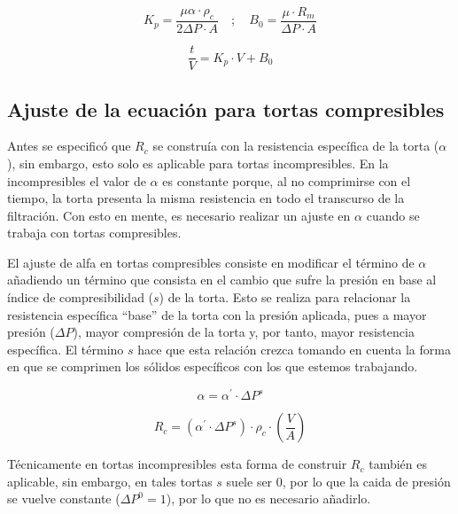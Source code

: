 \begin{equation}\label{eq:kp_y_b_en_eq_de_ruth}
    K_{p} = \frac{\mu\alpha\cdot\rho_{c}}{2\Delta P \cdot A}
    \quad;\quad
    B_{0} = \frac{\mu \cdot R_{m}}{\Delta P \cdot A}
\end{equation}

\begin{equation}\label{eq:ecuacion_linealizada_de_ruth}
    \frac{t}{V} = K_{p} \cdot V + B_{0}
\end{equation}



\subsection{Ajuste de la ecuación para tortas compresibles}

Antes se especificó que $R_{c}$ se construía con la resistencia específica de la torta ($\alpha$), sin embargo, esto solo es aplicable para tortas incompresibles. En la incompresibles el valor de $\alpha$ es constante porque, al no comprimirse con el tiempo, la torta presenta la misma resistencia en todo el transcurso de la filtración. Con esto en mente, es necesario realizar un ajuste en $\alpha$ cuando se trabaja con tortas compresibles.

El ajuste de alfa en tortas compresibles consiste en modificar el término de $\alpha$ añadiendo un término que consista en el cambio que sufre la presión en base al índice de compresibilidad ($s$) de la torta. Esto se realiza para relacionar la resistencia específica ``base'' de la torta con la presión aplicada, pues a mayor presión ($\Delta P$), mayor compresión de la torta y, por tanto, mayor resistencia específica. El término $s$ hace que esta relación crezca tomando en cuenta la forma en que se comprimen los sólidos específicos con los que estemos trabajando.

\begin{equation}\label{eq:alfa_en_tortas_compresibles}
    \alpha = \alpha^{\prime} \cdot \Delta P^{s}
\end{equation}

\begin{equation}
    R_{c} = (\alpha^{\prime} \cdot \Delta P^{s}) \cdot \rho_{c} \cdot \left(\frac{V}{A}\right)
\end{equation}

Técnicamente en tortas incompresibles esta forma de construir $R_{c}$ también es aplicable, sin embargo, en tales tortas $s$ suele ser 0, por lo que la caida de presión se vuelve constante ($\Delta P^{0} = 1$), por lo que no es necesario añadirlo.

